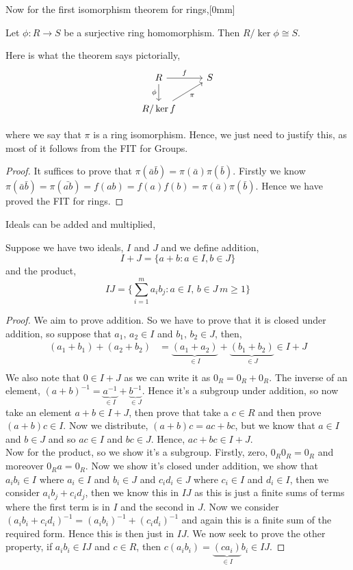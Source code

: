 
Now for the first isomorphism theorem for rings,[0mm]
\begin{nthm}
  Let $\phi : R \to S$ be a surjective ring homomorphism. Then $R/\ker\phi \cong S$.
\end{nthm}
Here is what the theorem says pictorially,
\[\begin{tikzcd}
	R & S \\
	{R/\ker f}
	\arrow["f", from=1-1, to=1-2]
	\arrow["\phi"', from=1-1, to=2-1]
	\arrow["\pi"', from=2-1, to=1-2]
\end{tikzcd}\]

where we say that $\pi$ is a ring isomorphism. Hence, we just need to justify this, as most of it follows from the FIT for Groups.
\begin{proof}
  It suffices to prove that $\pi(\bar a\bar b) = \pi(\bar a)\pi(\bar b)$. Firstly we know $\pi(\bar a\bar b) = \pi(\bar{ab}) = f(ab) = f(a)f(b) = \pi(\bar a)\pi(\bar b)$. Hence we have proved the FIT for rings.
\end{proof}

Ideals can be added and multiplied,
\begin{ndefi}
  Suppose we have two ideals, $I$ and $J$ and we define addition,
  $$ I + J = \{ a + b : a \in I, b \in J\} $$
  and the product,
  $$ IJ = \{\sum_{i=1}^m a_ib_j : a \in I,\,b\in J\, m \ge 1 \} $$
\end{ndefi}
\begin{proof}
  We aim to prove addition. So we have to prove that it is closed under addition, so suppose that $a_1,\,a_2 \in I$ and $b_1,\,b_2 \in J$, then,
  \begin{align*}
    (a_1 + b_1) + (a_2 + b_2) &= \underbrace{(a_1 + a_2)}_{\in I} + \underbrace{(b_1 + b_2)}_{\in J} \in I + J\\
  \end{align*}
  We also note that $0 \in I + J$ as we can write it as $0_R = 0_R + 0_R$. The inverse of an element, $(a + b)^{-1} = \underbrace{a^{-1}}_{\in I} + \underbrace{b^{-1}}_{\in J}$. Hence it's a subgroup under addition, so now take an element $a+b \in I + J$, then prove that take a $c \in R$ and then prove $(a + b)c \in I$. Now we distribute, $(a + b)c = ac + bc$, but we know that $a \in I$ and $b \in J$ and so $ac \in I$ and $bc \in J$. Hence, $ac + bc \in I + J$.\\

  \noindent
  Now for the product, so we show it's a subgroup. Firstly, zero, $0_R 0_R = 0_R$ and moreover $0_Ra = 0_R$. Now we show it's closed under addition, we show that $a_ib_i \in I$ where $a_i \in I$ and $b_i \in J$ and $c_id_i \in J$ where $c_i \in I$ and $d_i \in I$, then we consider $a_ib_j + c_id_j$, then we know this in $IJ$ as this is just a finite sums of terms where the first term is in $I$ and the second in $J$. Now we consider $(a_ib_i + c_id_i)^{-1} = (a_ib_i)^{-1} + (c_id_i)^{-1}$ and again this is a finite sum of the required form. Hence this is then just in $IJ$. We now seek to prove the other property, if $a_ib_i \in IJ$ and $c \in R$, then $c (a_ib_i) = \underbrace{(ca_i)}_{\in I}b_i \in IJ$.
\end{proof}
